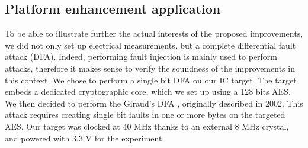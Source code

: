 	\subsection{Platform enhancement application}
		To be able to illustrate further the actual interests of the proposed improvements, we did not only set up electrical measurements, but a complete differential fault attack (DFA).
		Indeed, performing fault injection is mainly used to perform attacks, therefore it makes sense to verify the soundness of the improvements in this context.
		We chose to perform a single bit DFA ou our IC target.
		The target embeds a dedicated cryptographic core, which we set up using a 128 bits AES.
		We then decided to perform the Giraud's DFA \cite{giraudDfa}, originally described in 2002.
		This attack requires creating single bit faults in one or more bytes on the targeted AES.
		Our target was clocked at 40 MHz thanks to an external 8 MHz crystal, and powered with 3.3 V for the experiment.


